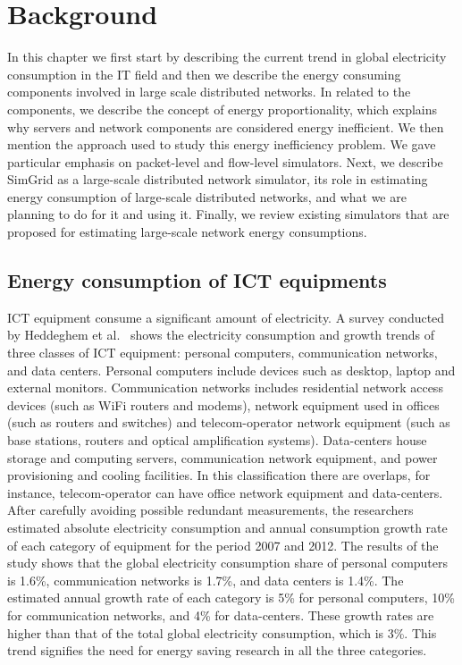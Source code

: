 \chapter{Background}
\label{chapter:background} 
In this chapter we first start by describing the current trend in global electricity consumption in the IT field and then we describe the energy consuming components involved in large scale distributed networks. In related to the components, we describe the concept of energy proportionality, which explains why servers and network components are considered energy inefficient. We then mention the approach used to study this energy inefficiency problem. We gave particular emphasis on packet-level and flow-level simulators. Next, we describe SimGrid as a large-scale distributed network simulator, its role in estimating energy consumption of large-scale distributed networks, and what we are planning to do for it and using it. Finally, we review existing simulators that are proposed for estimating large-scale network energy consumptions.
\section{Energy consumption of ICT equipments}
\label{section:ictequipment}
ICT equipment consume a significant amount of electricity. A survey conducted by Heddeghem et al.~\cite{DBLP:journals/comcom/HeddeghemLLCPD14} shows the electricity consumption and growth trends of three classes of ICT equipment: personal computers, communication networks, and data centers. Personal computers include devices such as desktop, laptop and external monitors. Communication networks includes residential network access devices (such as WiFi routers and modems), network equipment used in offices (such as routers and switches) and telecom-operator network equipment (such as base stations, routers and optical amplification systems). Data-centers house storage and computing servers, communication network equipment, and power provisioning and cooling facilities.  In this classification there are overlaps, for instance, telecom-operator can have office network equipment and data-centers. After carefully avoiding possible redundant measurements, the researchers estimated absolute electricity consumption and annual consumption growth rate of each category of equipment for the period 2007 and 2012. The results of the study shows that the global electricity consumption share of personal computers is 1.6\%, communication networks is 1.7\%, and data centers is 1.4\%. The estimated annual growth rate of each category is 5\% for personal computers, 10\% for communication networks, and 4\% for data-centers. These growth rates are higher than that of the total global electricity consumption, which is 3\%. This trend signifies the need for energy saving research in all the three categories.
